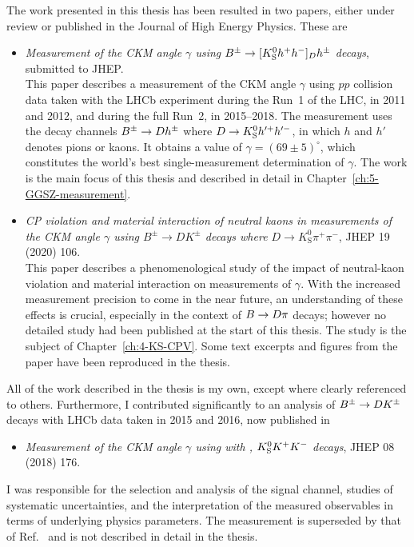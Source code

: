 The work presented in this thesis has been resulted in two papers, either under review or published in the Journal of High Energy Physics. These are
\begin{itemize}

    \item [] \cite{GGSZ-B2Dh} \emph{Measurement of the CKM angle $\gamma$ using ${{B}^\pm}\rightarrow [{{K}^0_{\mathrm{S}}} h^+h^-]_{D} h^\pm$ decays}, submitted to JHEP. \\
    This paper describes a measurement of the CKM angle $\gamma$ using $pp$ collision data taken with the LHCb experiment during the Run~1 of the LHC, in 2011 and 2012, and during the full Run~2, in 2015--2018. The measurement uses the decay channels ${{B}^\pm}\rightarrow{\ensuremath{D}} h^\pm$ where ${D}\rightarrow{\ensuremath{{K}^0_{\mathrm{S}}}} h'^+h'^-$, in which $h$ and $h'$ denotes pions or kaons. It obtains a value of $\gamma = (69\pm5)^\circ$, which constitutes the world's best single-measurement determination of $\gamma$. The work is the main focus of this thesis and described in detail in Chapter~\ref{ch:5-GGSZ-measurement}.

    \item [] \cite{KsCPV} \emph{CP violation and material interaction of neutral kaons
                        in measurements of the CKM angle $\gamma$ using $B^\pm\to
                        DK^\pm$ decays where $D\to K_\text{S}^0\pi^+\pi^-$}, JHEP 19 (2020) 106. \\
                        This paper describes a phenomenological study of the impact of neutral-kaon \CP violation and material interaction on measurements of $\gamma$. With the increased measurement precision to come in the near future, an understanding of these effects is crucial, especially in the context of ${B}\rightarrow{\ensuremath{D}}\pi$ decays; however no detailed study had been published at the start of this thesis. The study is the subject of Chapter~\ref{ch:4-KS-CPV}. Some text excerpts and figures from the paper have been reproduced in the thesis.
\end{itemize}
All of the work described in the thesis is my own, except where clearly referenced to others. Furthermore, I contributed significantly to an analysis of ${{B}^\pm}\rightarrow{\ensuremath{D}}{\ensuremath{{K}^\pm}}$ decays with LHCb data taken in 2015 and 2016, now published in
\begin{itemize}
    \item [] \cite{LHCb-PAPER-2018-017} \emph{Measurement of the CKM angle $\gamma$ using  with , ${{K}^0_{\mathrm{S}}} K^+K^-$ decays}, JHEP 08 (2018) 176.
\end{itemize}
I was responsible for the selection and analysis of the signal channel, studies of systematic uncertainties, and the interpretation of the measured observables in terms of underlying physics parameters. The measurement is superseded by that of Ref.~\cite{GGSZ-B2Dh} and is not described in detail in the thesis.

